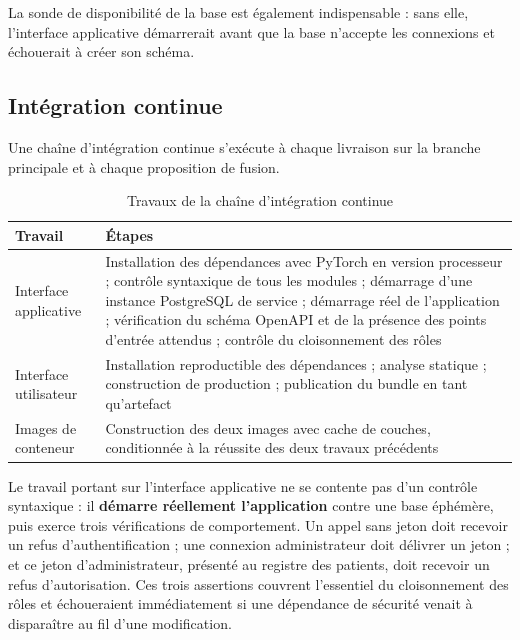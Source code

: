 La sonde de disponibilité de la base est également indispensable : sans elle, l'interface
applicative démarrerait avant que la base n'accepte les connexions et échouerait à créer son
schéma.

\subsection{Intégration continue}

Une chaîne d'intégration continue s'exécute à chaque livraison sur la branche principale et à
chaque proposition de fusion.

\begin{table}[H]
\centering

\small
\begin{tabular}{@{}lL{10.4cm}@{}}
\toprule
\textbf{Travail} & \textbf{Étapes} \\
\midrule
Interface applicative &
Installation des dépendances avec PyTorch en version processeur ; contrôle syntaxique
de tous les modules ; démarrage d'une instance PostgreSQL de service ; démarrage réel
de l'application ; vérification du schéma OpenAPI et de la présence des points
d'entrée attendus ; contrôle du cloisonnement des rôles \\
\addlinespace[3pt]
Interface utilisateur &
Installation reproductible des dépendances ; analyse statique ; construction de
production ; publication du bundle en tant qu'artefact \\
\addlinespace[3pt]
Images de conteneur &
Construction des deux images avec cache de couches, conditionnée à la réussite des
deux travaux précédents \\
\bottomrule
\end{tabular}
\caption{Travaux de la chaîne d'intégration continue}
\label{tab:ci}
\end{table}

Le travail portant sur l'interface applicative ne se contente pas d'un contrôle syntaxique : il
\textbf{démarre réellement l'application} contre une base éphémère, puis exerce trois
vérifications de comportement. Un appel sans jeton doit recevoir un refus d'authentification ;
une connexion administrateur doit délivrer un jeton ; et ce jeton d'administrateur, présenté au
registre des patients, doit recevoir un refus d'autorisation. Ces trois assertions couvrent
l'essentiel du cloisonnement des rôles et échoueraient immédiatement si une dépendance de
sécurité venait à disparaître au fil d'une modification.


